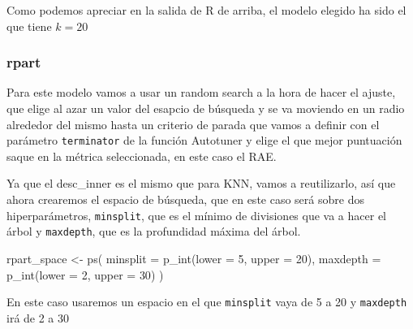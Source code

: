 \documentclass[
  11pt,
  a4paper,
]{article}
\newenvironment{Shaded}{\begin{snugshade}}{\end{snugshade}}
\newcommand{\AttributeTok}[1]{\textcolor[rgb]{0.77,0.63,0.00}{#1}}
\newcommand{\CommentTok}[1]{\textcolor[rgb]{0.56,0.35,0.01}{\textit{#1}}}
\newcommand{\ConstantTok}[1]{\textcolor[rgb]{0.00,0.00,0.00}{#1}}
\newcommand{\DecValTok}[1]{\textcolor[rgb]{0.00,0.00,0.81}{#1}}
\newcommand{\FunctionTok}[1]{\textcolor[rgb]{0.00,0.00,0.00}{#1}}
\newcommand{\NormalTok}[1]{#1}
\newcommand{\OtherTok}[1]{\textcolor[rgb]{0.56,0.35,0.01}{#1}}
\newcommand{\SpecialCharTok}[1]{\textcolor[rgb]{0.00,0.00,0.00}{#1}}
\newcommand{\StringTok}[1]{\textcolor[rgb]{0.31,0.60,0.02}{#1}}
\begin{document}
Como podemos apreciar en la salida de R de arriba, el modelo elegido ha
sido el que tiene \(k=20\)

\subsubsection{rpart}

Para este modelo vamos a usar un random search a la hora de hacer el
ajuste, que elige al azar un valor del esapcio de búsqueda y se va
moviendo en un radio alrededor del mismo hasta un criterio de parada que
vamos a definir con el parámetro \texttt{terminator} de la función
Autotuner y elige el que mejor puntuación saque en la métrica
seleccionada, en este caso el RAE.

Ya que el desc\_inner es el mismo que para KNN, vamos a reutilizarlo,
así que ahora crearemos el espacio de búsqueda, que en este caso será
sobre dos hiperparámetros, \texttt{minsplit}, que es el mínimo de
divisiones que va a hacer el árbol y \texttt{maxdepth}, que es la
profundidad máxima del árbol.

\begin{Shaded}
\begin{Highlighting}[]
\NormalTok{rpart\_space }\OtherTok{\textless{}{-}} \FunctionTok{ps}\NormalTok{(}
  \AttributeTok{minsplit =} \FunctionTok{p\_int}\NormalTok{(}\AttributeTok{lower =} \DecValTok{5}\NormalTok{, }\AttributeTok{upper =} \DecValTok{20}\NormalTok{),}
  \AttributeTok{maxdepth =} \FunctionTok{p\_int}\NormalTok{(}\AttributeTok{lower =} \DecValTok{2}\NormalTok{, }\AttributeTok{upper =} \DecValTok{30}\NormalTok{)}
\NormalTok{)}
\end{Highlighting}
\end{Shaded}

En este caso usaremos un espacio en el que \texttt{minsplit} vaya de 5 a
20 y \texttt{maxdepth} irá de 2 a 30

\begin{Shaded}
\end{Shaded}
\end{document}
